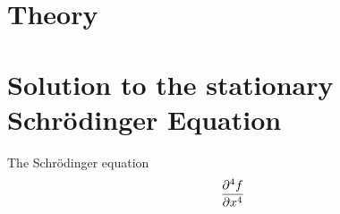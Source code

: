 \section{Theory}
\section{Solution to the stationary Schrödinger Equation}
The Schrödinger equation
\begin{align}
    \partialfrac[4]{f}{x}
\end{align}



